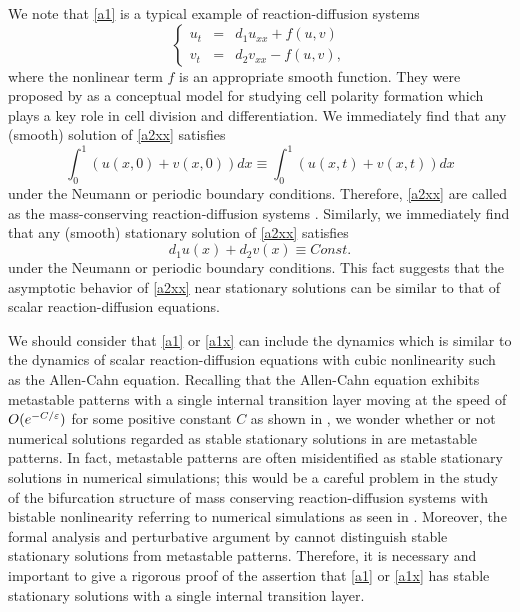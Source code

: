 \documentclass[a4,10pt]{article}
\begin{document}
We note that \eqref{a1} is a typical example of reaction-diffusion systems
%
\begin{equation}\label{a2xx}
\left \{
\begin{array}{rcl}
u_t & = & d_1 u_{xx} +  f(u,v)  \\[1ex]
v_t & = &d_2 v_{xx}  -  f(u,v),
\end{array} 
\right.
\end{equation}
%
where the nonlinear term $f$ is an appropriate smooth function. 
They were proposed by \cite{Is, Ot} as a conceptual model for studying cell polarity formation which plays a key role in cell division and differentiation.
We immediately find that
any (smooth) solution of \eqref{a2xx} satisfies
%
\[%
\int_0^1 \left( u(x, 0) + v(x, 0) \right) dx \equiv 
\int_0^1 \left( u(x, t) + v(x, t) \right) dx
\]%
%
under the Neumann or periodic boundary conditions.
Therefore, \eqref{a2xx} are called as the mass-conserving reaction-diffusion systems
\cite{BJF}.
Similarly, we immediately find that 
any (smooth) stationary solution of \eqref{a2xx} 
satisfies 
%
\[%
d_1 u(x) + d_2 v(x) \equiv Const.
\]%
%
under the Neumann or periodic boundary conditions. This fact suggests that
the asymptotic behavior of \eqref{a2xx} near stationary solutions can be similar to that of
scalar reaction-diffusion equations.


We should consider that  \eqref{a1} or \eqref{a1x} can include the dynamics which is 
similar to the dynamics of scalar 
reaction-diffusion equations with cubic nonlinearity such as the Allen-Cahn equation.
Recalling that the Allen-Cahn equation exhibits metastable patterns with
a single internal transition layer moving at the speed of $O(e^{-C/\varepsilon})$ for some positive constant $C$
as shown in \cite{CP, HF, KO},
we wonder whether or not numerical solutions regarded as
stable stationary solutions in \cite{MJE1, MJE2} are metastable patterns.
In fact, metastable patterns are often misidentified as stable stationary solutions 
in numerical simulations; this would be a careful problem
in the study of the bifurcation structure of 
mass conserving reaction-diffusion systems with bistable nonlinearity
referring to numerical simulations as seen in \cite{MJE2}.
Moreover, the formal analysis and perturbative argument by \cite{MJE1,MJE2}
cannot distinguish stable stationary solutions from
metastable patterns.
Therefore, it is necessary and important to give a rigorous proof of the assertion that
\eqref{a1} or \eqref{a1x} has stable stationary solutions with a single internal transition layer.
\end{document}
